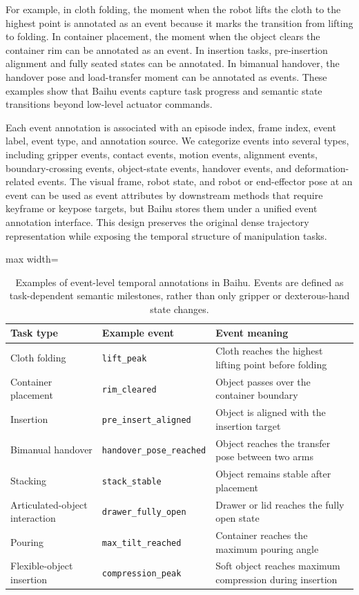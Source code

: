 For example, in cloth folding, the moment when the robot lifts the cloth to the highest point is annotated as an event because it marks the transition from lifting to folding. In container placement, the moment when the object clears the container rim can be annotated as an event. In insertion tasks, pre-insertion alignment and fully seated states can be annotated. In bimanual handover, the handover pose and load-transfer moment can be annotated as events. These examples show that Baihu events capture task progress and semantic state transitions beyond low-level actuator commands.

Each event annotation is associated with an episode index, frame index, event label, event type, and annotation source. We categorize events into several types, including gripper events, contact events, motion events, alignment events, boundary-crossing events, object-state events, handover events, and deformation-related events. The visual frame, robot state, and robot or end-effector pose at an event can be used as event attributes by downstream methods that require keyframe or keypose targets, but Baihu stores them under a unified event annotation interface. This design preserves the original dense trajectory representation while exposing the temporal structure of manipulation tasks.

\begin{table}[t]
\centering
\caption{Examples of event-level temporal annotations in Baihu. Events are defined as task-dependent semantic milestones, rather than only gripper or dexterous-hand state changes.}
\label{tab:event-keyframe-examples}
\footnotesize
\setlength{\tabcolsep}{4pt}
\renewcommand{\arraystretch}{1.08}
\begin{adjustbox}{max width=\textwidth}
\begin{tabular}{lll}
\toprule
Task type & Example event & Event meaning \\
\midrule
Cloth folding & \texttt{lift\_peak} & Cloth reaches the highest lifting point before folding \\
Container placement & \texttt{rim\_cleared} & Object passes over the container boundary \\
Insertion & \texttt{pre\_insert\_aligned} & Object is aligned with the insertion target \\
Bimanual handover & \texttt{handover\_pose\_reached} & Object reaches the transfer pose between two arms \\
Stacking & \texttt{stack\_stable} & Object remains stable after placement \\
Articulated-object interaction & \texttt{drawer\_fully\_open} & Drawer or lid reaches the fully open state \\
Pouring & \texttt{max\_tilt\_reached} & Container reaches the maximum pouring angle \\
Flexible-object insertion & \texttt{compression\_peak} & Soft object reaches maximum compression during insertion \\
\bottomrule
\end{tabular}
\end{adjustbox}
\end{table}

